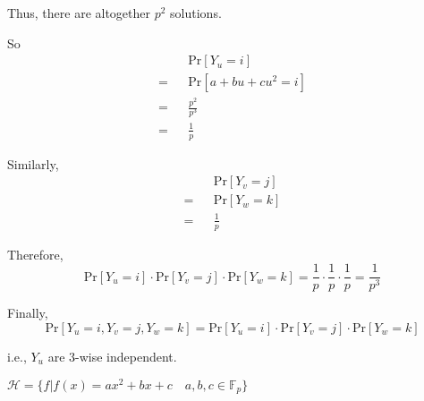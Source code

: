 			Thus, there are altogether $p^2$ solutions.
			
			So
			\begin{eqnarray*}
				&&\text{Pr}[Y_u = i] \\
				= &&\text{Pr}[a + bu + cu^2 = i] \\
				= &&\frac{p^2}{p^3} \\
				= &&\frac{1}{p}
			\end{eqnarray*}
			
			Similarly,
			\begin{eqnarray*}
				&&\text{Pr}[Y_v = j] \\
				= &&\text{Pr}[Y_w = k] \\
				= &&\frac{1}{p}
			\end{eqnarray*}
			
			Therefore,
			\[
				\text{Pr}[Y_u = i] \cdot \text{Pr}[Y_v = j] \cdot \text{Pr}[Y_w = k] = \frac{1}{p} \cdot \frac{1}{p} \cdot \frac{1}{p} = \frac{1}{p^3}
			\]
			
			Finally,
			\[
				\text{Pr}[Y_u = i, Y_v = j, Y_w = k] = \text{Pr}[Y_u = i] \cdot \text{Pr}[Y_v = j] \cdot \text{Pr}[Y_w = k]
			\]
			
			i.e., $Y_u$ are $3$-wise independent.
		\item
		
			$\mathcal{H} = \{ f | f(x) = a x^2 + b x + c \quad a,b,c \in \mathbb{F}_{p} \}$
			
